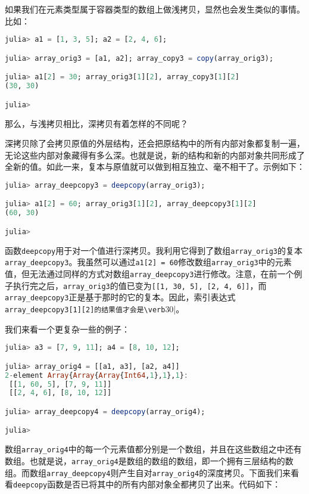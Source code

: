 如果我们在元素类型属于容器类型的数组上做浅拷贝，显然也会发生类似的事情。比如：

\begin{lstlisting}[language=julia]
julia> a1 = [1, 3, 5]; a2 = [2, 4, 6];

julia> array_orig3 = [a1, a2]; array_copy3 = copy(array_orig3);

julia> a1[2] = 30; array_orig3[1][2], array_copy3[1][2]
(30, 30)

julia> 
\end{lstlisting}

那么，与浅拷贝相比，深拷贝有着怎样的不同呢？

深拷贝除了会拷贝原值的外层结构，还会把原结构中的所有内部对象都复制一遍，无论这些内部对象藏得有多么深。也就是说，新的结构和新的内部对象共同形成了全新的值。如此一来，复本与原值就可以做到相互独立、毫不相干了。示例如下：

\begin{lstlisting}[language=julia]
julia> array_deepcopy3 = deepcopy(array_orig3);

julia> a1[2] = 60; array_orig3[1][2], array_deepcopy3[1][2]
(60, 30)

julia> 
\end{lstlisting}

函数\verb|deepcopy|用于对一个值进行深拷贝。我利用它得到了数组\verb|array_orig3|的复本\verb|array_deepcopy3|。我虽然可以通过\verb|a1[2] = 60|修改数组\verb|array_orig3|中的元素值，但无法通过同样的方式对数组\verb|array_deepcopy3|进行修改。注意，在前一个例子执行完之后，\verb|array_orig3|的值已变为\verb|[[1, 30, 5], [2, 4, 6]]|，而\verb|array_deepcopy3|正是基于那时的它的复本。因此，索引表达式\verb|array_deepcopy3[1][2]的结果值才会是\verb|30|。

我们来看一个更复杂一些的例子：

\begin{lstlisting}[language=julia]
julia> a3 = [7, 9, 11]; a4 = [8, 10, 12];

julia> array_orig4 = [[a1, a3], [a2, a4]]
2-element Array{Array{Array{Int64,1},1},1}:
 [[1, 60, 5], [7, 9, 11]]
 [[2, 4, 6], [8, 10, 12]]

julia> array_deepcopy4 = deepcopy(array_orig4);

julia> 
\end{lstlisting}

数组\verb|array_orig4|中的每一个元素值都分别是一个数组，并且在这些数组之中还有数组。也就是说，\verb|array_orig4|是数组的数组的数组，即一个拥有三层结构的数组。而数组\verb|array_deepcopy4|则产生自对\verb|array_orig4|的深度拷贝。下面我们来看看\verb|deepcopy|函数是否已将其中的所有内部对象全都拷贝了出来。代码如下：

